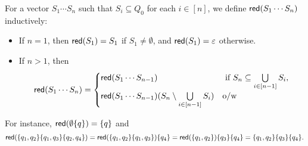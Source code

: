 For a vector $S_1 \cdots S_n$ such that $S_i \subseteq Q_0$ for each $i \in [n]$, we define $\mathsf{red}(S_1 \cdots S_n)$ inductively:
\begin{itemize}
\item If $n = 1$, then $\mathsf{red}(S_1)=S_1$ if $S_1 \neq \emptyset$, and $\mathsf{red}(S_1)=\varepsilon$ otherwise.
%
\item If $n > 1$, then
\[
\mathsf{red}(S_1 \cdots S_n)=
\begin{cases}
\mathsf{red}(S_1 \cdots S_{n-1}) & \mbox{ if } S_n \subseteq \bigcup \limits_{i \in [n-1]} S_i,\\
\mathsf{red}(S_1 \cdots S_{n-1}) (S_n \setminus \bigcup \limits_{i \in [n-1]} S_i) &  \mbox{o/w}
\end{cases}
\]
%
\end{itemize}
For instance,
%
$\mathsf{red}(\emptyset\{q\})=\{q\}$ and
$$\mathsf{red}(\{q_1, q_2\} \{q_1, q_3\} \{q_2, q_4\})=\mathsf{red}(\{q_1,q_2\}\{q_1,q_3\})\{q_4\}= \mathsf{red}(\{q_1,q_2\}) \{q_3\} \{q_4\} = \{q_1,q_2\} \{q_3\}\{q_4\}.$$

